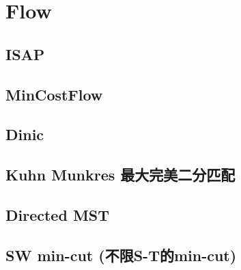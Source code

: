 \documentclass[a4paper,10pt,twocolumn,oneside]{article}
\begin{document}
\section{Flow}

\subsection{ISAP}


\subsection{MinCostFlow}


\subsection{Dinic}


%

%

\subsection{Kuhn Munkres 最大完美二分匹配}


\subsection{Directed MST}


\subsection{SW min-cut (不限S-T的min-cut)}


% 
\end{document}
